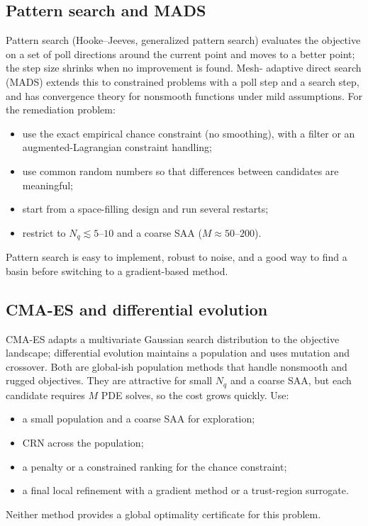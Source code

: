 \documentclass[11pt]{article}
\numberwithin{equation}{section}
\theoremstyle{plain}
\begin{document}
\subsection{Pattern search and MADS}

Pattern search (Hooke--Jeeves, generalized pattern search) evaluates the
objective on a set of poll directions around the current point and moves to a
better point; the step size shrinks when no improvement is found.  Mesh-
adaptive direct search (MADS) extends this to constrained problems with a
poll step and a search step, and has convergence theory for nonsmooth
functions under mild assumptions.  For the remediation problem:
\begin{itemize}[leftmargin=1.6em,itemsep=2pt]
  \item use the exact empirical chance constraint (no smoothing), with a
        filter or an augmented-Lagrangian constraint handling;
  \item use common random numbers so that differences between candidates are
        meaningful;
  \item start from a space-filling design and run several restarts;
  \item restrict to $N_q\lesssim5$--$10$ and a coarse SAA ($M\approx50$--$200$).
\end{itemize}
Pattern search is easy to implement, robust to noise, and a good way to find a
basin before switching to a gradient-based method.

\subsection{CMA-ES and differential evolution}

CMA-ES adapts a multivariate Gaussian search distribution to the objective
landscape; differential evolution maintains a population and uses mutation and
crossover.  Both are global-ish population methods that handle nonsmooth and
rugged objectives.  They are attractive for small $N_q$ and a coarse SAA, but
each candidate requires $M$ PDE solves, so the cost grows quickly.  Use:
\begin{itemize}[leftmargin=1.6em,itemsep=2pt]
  \item a small population and a coarse SAA for exploration;
  \item CRN across the population;
  \item a penalty or a constrained ranking for the chance constraint;
  \item a final local refinement with a gradient method or a trust-region
        surrogate.
\end{itemize}
Neither method provides a global optimality certificate for this problem.
\end{document}
